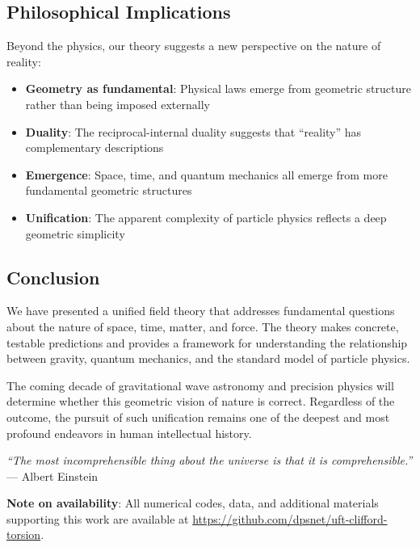 \subsection{Philosophical Implications}

Beyond the physics, our theory suggests a new perspective on the nature of reality:

\begin{itemize}
    \item \textbf{Geometry as fundamental}: Physical laws emerge from geometric structure rather than being imposed externally
    \item \textbf{Duality}: The reciprocal-internal duality suggests that ``reality'' has complementary descriptions
    \item \textbf{Emergence}: Space, time, and quantum mechanics all emerge from more fundamental geometric structures
    \item \textbf{Unification}: The apparent complexity of particle physics reflects a deep geometric simplicity
\end{itemize}

\subsection{Conclusion}

We have presented a unified field theory that addresses fundamental questions about the nature of space, time, matter, and force. The theory makes concrete, testable predictions and provides a framework for understanding the relationship between gravity, quantum mechanics, and the standard model of particle physics.

The coming decade of gravitational wave astronomy and precision physics will determine whether this geometric vision of nature is correct. Regardless of the outcome, the pursuit of such unification remains one of the deepest and most profound endeavors in human intellectual history.

\begin{center}
\textit{``The most incomprehensible thing about the universe is that it is comprehensible.''}\\
--- Albert Einstein
\end{center}

\vspace{1cm}

\noindent\textbf{Note on availability}: All numerical codes, data, and additional materials supporting this work are available at \url{https://github.com/dpsnet/uft-clifford-torsion}.
